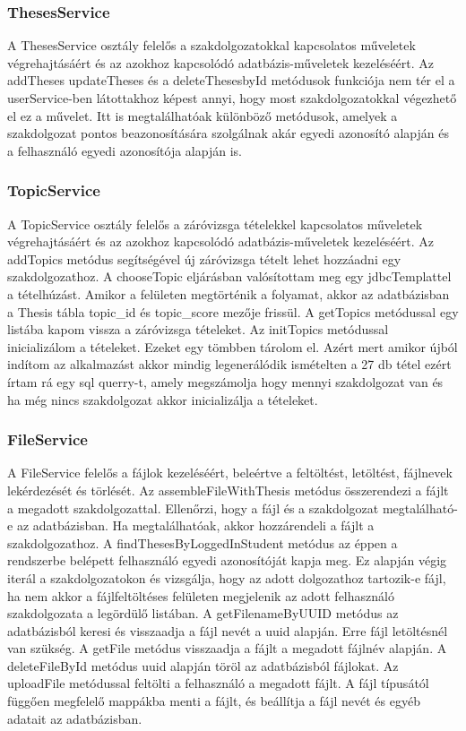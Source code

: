 \subsubsection{ThesesService}

A ThesesService osztály felelős a szakdolgozatokkal kapcsolatos műveletek végrehajtásáért és az azokhoz kapcsolódó adatbázis-műveletek kezeléséért. Az addTheses updateTheses és a deleteThesesbyId metódusok funkciója nem tér el a userService-ben látottakhoz képest annyi, hogy most szakdolgozatokkal végezhető el ez a művelet. Itt is megtalálhatóak különböző metódusok, amelyek a szakdolgozat pontos beazonosítására szolgálnak akár egyedi azonosító alapján és a felhasználó egyedi azonosítója alapján is.

\subsubsection{TopicService}

A TopicService osztály felelős a záróvizsga tételekkel kapcsolatos műveletek végrehajtásáért és az azokhoz kapcsolódó adatbázis-műveletek kezeléséért. Az addTopics metódus segítségével új záróvizsga tételt lehet hozzáadni egy szakdolgozathoz. A chooseTopic eljárásban valósítottam meg egy jdbcTemplattel a tételhúzást. Amikor a felületen megtörténik a folyamat, akkor az adatbázisban a Thesis tábla topic\_id és topic\_score mezője frissül. A getTopics metódussal egy listába kapom vissza a záróvizsga tételeket. Az initTopics metódussal inicializálom a tételeket. Ezeket egy tömbben tárolom el. Azért mert amikor újból indítom az alkalmazást akkor mindig legenerálódik ismételten a 27 db tétel ezért írtam rá egy sql querry-t, amely megszámolja hogy mennyi szakdolgozat van és ha még nincs szakdolgozat akkor inicializálja a tételeket.

\subsubsection{FileService}%

A FileService felelős a fájlok kezeléséért, beleértve a feltöltést, letöltést, fájlnevek lekérdezését és törlését. Az assembleFileWithThesis metódus összerendezi a fájlt a megadott szakdolgozattal. Ellenőrzi, hogy a fájl és a szakdolgozat megtalálható-e az adatbázisban. Ha megtalálhatóak, akkor hozzárendeli a fájlt a szakdolgozathoz. A findThesesByLoggedInStudent metódus az éppen a rendszerbe belépett felhasználó egyedi azonosítóját kapja meg. Ez alapján végig iterál a szakdolgozatokon és vizsgálja, hogy az adott dolgozathoz tartozik-e fájl, ha nem akkor a fájlfeltöltéses felületen megjelenik az adott felhasználó szakdolgozata a legördülő listában. A getFilenameByUUID metódus az adatbázisból keresi és visszaadja a fájl nevét a uuid alapján. Erre fájl letöltésnél van szükség. A getFile metódus visszaadja a fájlt a megadott fájlnév alapján. A deleteFileById metódus uuid alapján töröl az adatbázisból fájlokat. Az uploadFile metódussal feltölti a felhasználó a megadott fájlt. A fájl típusától függően megfelelő mappákba menti a fájlt, és beállítja a fájl nevét és egyéb adatait az adatbázisban.

